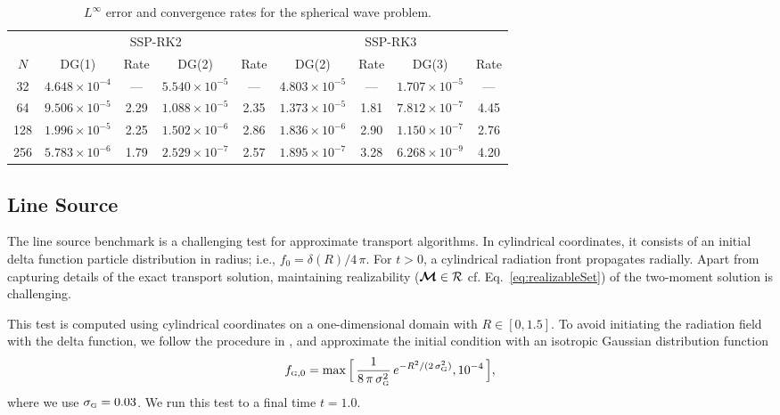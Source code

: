 \documentclass[10pt,preprint]{aastex}
\begin{document}
\begin{table}
  \begin{center}
  \caption{$L^{\infty}$ error and convergence rates for the spherical wave problem.}
  \label{tab:sphericalWave}
  \begin{tabular}{ccccccccc}
    & \multicolumn{4}{c}{SSP-RK2} & \multicolumn{4}{c}{SSP-RK3} \\
    \cmidrule(r){2-5} \cmidrule(r){6-9}
    $N$ & DG(1) & Rate & DG(2) & Rate & DG(2) & Rate & DG(3) & Rate \\
    \midrule \midrule
    32   & $4.648\times10^{-4}$ & ---  & $5.540\times10^{-5}$ & ---   & $4.803\times10^{-5}$ & ---  & $1.707\times10^{-5}$ & --- \\
    64   & $9.506\times10^{-5}$ &2.29& $1.088\times10^{-5}$ &2.35& $1.373\times10^{-5}$ &1.81& $7.812\times10^{-7}$ &4.45 \\
    128 & $1.996\times10^{-5}$ &2.25& $1.502\times10^{-6}$ &2.86& $1.836\times10^{-6}$ &2.90& $1.150\times10^{-7}$ &2.76 \\
    256 & $5.783\times10^{-6}$ &1.79& $2.529\times10^{-7}$ &2.57& $1.895\times10^{-7}$ &3.28& $6.268\times10^{-9}$ &4.20 \\
    \midrule \midrule
  \end{tabular}
  \end{center}
\end{table}

\subsection{Line Source}

The line source benchmark \citep[cf.][]{brunner_2002,garrettHauck_2013} is a challenging test for approximate transport algorithms.  
In cylindrical coordinates, it consists of an initial delta function particle distribution in radius; i.e., $f_{0}=\delta(R)/4\,\pi$.  
For $t>0$, a cylindrical radiation front propagates radially.  
Apart from capturing details of the exact transport solution, maintaining realizability ($\boldsymbol{\mathcal{M}}\in\mathcal{R}$ cf. Eq.~\eqref{eq:realizableSet}) of the two-moment solution is challenging.  

This test is computed using cylindrical coordinates on a one-dimensional domain with $R\in[0,1.5]$.  
To avoid initiating the radiation field with the delta function, we follow the procedure in \citet{garrettHauck_2013}, and approximate the initial condition with an isotropic Gaussian distribution function
\begin{equation}
  f_{\mbox{\tiny G},0}
  =\max\Big[\,\frac{1}{8\,\pi\,\sigma_{\mbox{\tiny G}}^{2}}\,e^{-R^{2}/(2\,\sigma_{\mbox{\tiny G}}^{2})},10^{-4}\,\Big],
\end{equation}
where we use $\sigma_{\mbox{\tiny G}}=0.03$.  
We run this test to a final time $t=1.0$.  
\end{document}
